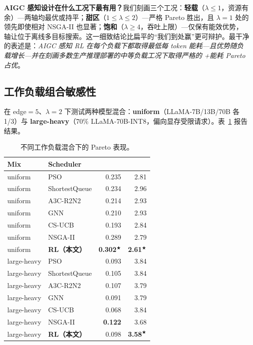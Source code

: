\textbf{AIGC 感知设计在什么工况下最有用？}我们刻画三个工况：\textbf{轻载}（$\lambda \le 1$，资源有余）---两轴均最优或持平；\textbf{甜区}（$1 \le \lambda \le 2$）---严格 Pareto 胜出，且 $\lambda{=}1$ 处的 \slo{} 领先即使相对 NSGA-II 也显著；\textbf{饱和}（$\lambda \ge 4$，吞吐上限）---仅保有能效优势，\slo{} 轴让位于离线多目标搜索。这一细致结论比扁平的“我们到处赢”更可辩护。最干净的表述是：\emph{AIGC 感知 RL 在每个负载下都取得最低每 token 能耗---且优势随负载增长---并在刻画多数生产推理部署的中等负载工况下取得严格的 \slo{}+能耗 Pareto 占优}。

\subsection{工作负载组合敏感性}
\label{sec:workload}

在 edge${=}5$、$\lambda{=}2$ 下测试两种模型混合：\textbf{uniform}（LLaMA-7B/13B/70B 各 1/3）与 \textbf{large-heavy}（70\% LLaMA-70B-INT8，偏向显存受限请求）。表~\ref{tab:workload} 报告结果。

\begin{table}[t]
  \centering
  \caption{不同工作负载混合下的 Pareto 表现。}
  \label{tab:workload}
  \small
  \begin{tabular}{llrr}
    \toprule
    Mix & Scheduler & \slo{} & \etok{} \\
    \midrule
    uniform & PSO            & 0.235 & 2.81 \\
    uniform & ShortestQueue  & 0.234 & 2.96 \\
    uniform & A3C-R2N2       & 0.214 & 2.93 \\
    uniform & GNN            & 0.210 & 2.93 \\
    uniform & CS-UCB         & 0.193 & 2.84 \\
    uniform & NSGA-II        & 0.289 & 2.79 \\
    uniform & \textbf{RL（本文）}
            & \textbf{0.302}$^\bigstar$ & \textbf{2.61}$^\bigstar$ \\
    \midrule
    large-heavy & PSO            & 0.093 & 3.84 \\
    large-heavy & ShortestQueue  & 0.105 & 3.84 \\
    large-heavy & A3C-R2N2       & 0.107 & 3.79 \\
    large-heavy & GNN            & 0.091 & 3.79 \\
    large-heavy & CS-UCB         & 0.068 & 3.84 \\
    large-heavy & NSGA-II        & \textbf{0.122} & 3.68 \\
    large-heavy & \textbf{RL（本文）}
                & 0.098 & \textbf{3.58}$^\bigstar$ \\
    \bottomrule
  \end{tabular}
\end{table}

